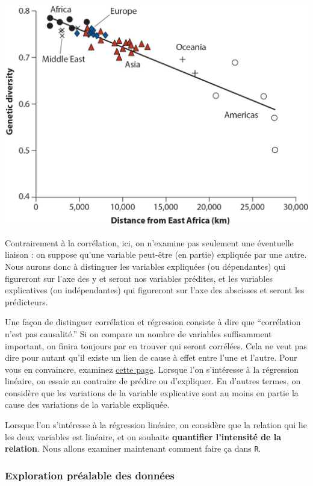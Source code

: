 \documentclass[
  a4paper,
]{article}
\begin{document}
\includegraphics{images/genetics.jpg}

Contrairement à la corrélation, ici, on n'examine pas seulement une éventuelle liaison : on suppose qu'une variable peut-être (en partie) expliquée par une autre. Nous aurons donc à distinguer les variables expliquées (ou dépendantes) qui figureront sur l'axe des y et seront nos variables prédites, et les variables explicatives (ou indépendantes) qui figureront sur l'axe des abscisses et seront les prédicteurs.

Une façon de distinguer corrélation et régression consiste à dire que ``corrélation n'est pas causalité.'' Si on compare un nombre de variables suffisamment important, on finira toujours par en trouver qui seront corrélées. Cela ne veut pas dire pour autant qu'il existe un lien de cause à effet entre l'une et l'autre. Pour vous en convaincre, examinez \href{http://www.tylervigen.com/spurious-correlations}{cette page}. Lorsque l'on s'intéresse à la régression linéaire, on essaie au contraire de prédire ou d'expliquer. En d'autres termes, on considère que les variations de la variable explicative sont au moins en partie la cause des variations de la variable expliquée.

Lorsque l'on s'intéresse à la régression linéaire, on considère que la relation qui lie les deux variables est linéaire, et on souhaite \textbf{quantifier l'intensité de la relation}. Nous allons examiner maintenant comment faire ça dans \texttt{R}.

\hypertarget{exploration-pruxe9alable-des-donnuxe9es-3}{%
\subsubsection{Exploration préalable des données}\label{exploration-pruxe9alable-des-donnuxe9es-3}}
\end{document}
